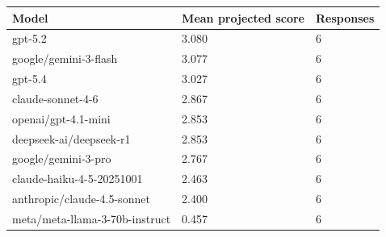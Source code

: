 \begin{tabular}{lll}
\toprule
Model & Mean projected score & Responses \\
\midrule
gpt-5.2 & 3.080 & 6 \\
google/gemini-3-flash & 3.077 & 6 \\
gpt-5.4 & 3.027 & 6 \\
claude-sonnet-4-6 & 2.867 & 6 \\
openai/gpt-4.1-mini & 2.853 & 6 \\
deepseek-ai/deepseek-r1 & 2.853 & 6 \\
google/gemini-3-pro & 2.767 & 6 \\
claude-haiku-4-5-20251001 & 2.463 & 6 \\
anthropic/claude-4.5-sonnet & 2.400 & 6 \\
meta/meta-llama-3-70b-instruct & 0.457 & 6 \\
\bottomrule
\end{tabular}
